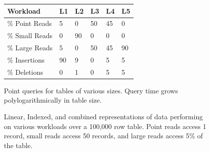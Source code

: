\documentclass[letterpaper,twocolumn,10pt]{article}
\begin{document}
\begin{figure}
\begin{minipage}{0.64\textwidth}
\begin{minipage}{.5\textwidth}
\end{minipage}
      \begin{minipage}{.5\textwidth}\vspace{.2cm}
\centering
\small
\setlength\tabcolsep{3.5pt}
\begin{tabular}{llllll}
\textbf{Workload}&L1&L2&L3&L4& L5\\\hline
\% Point Reads & 5& 0& 50& 45& 0\\
\% Small Reads & 0& 90& 0& 0& 0\\
\% Large Reads & 5&0&50&45&90\\
\% Insertions& 90& 9& 0& 5& 5\\
\% Deletions & 0& 1& 0& 5& 5\\
\end{tabular}
\end{minipage}
    \end{minipage}
    \begin{minipage}{.32\textwidth}
    		\caption{\small Point queries for tables of various sizes. Query time grows polylogarithmically in table size.}
		\label{figScaling}
    \end{minipage}\hspace{.2cm}
    \begin{minipage}{.64\textwidth}
    \caption{\small Linear, Indexed, and combined representations of data performing on various workloads over a 100,000 row table. Point reads access 1 record, small reads access 50 records, and large reads access 5\% of the table.}
\label{figworkload}
    \end{minipage}
\end{figure}
\end{document}
